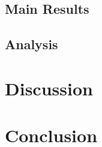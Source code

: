 \subsection{Main Results}\label{sec:main-results}
\subsection{Analysis}\label{sec:analysis}

\section{Discussion}\label{sec:discussion}
\section{Conclusion}\label{sec:conclusion}
